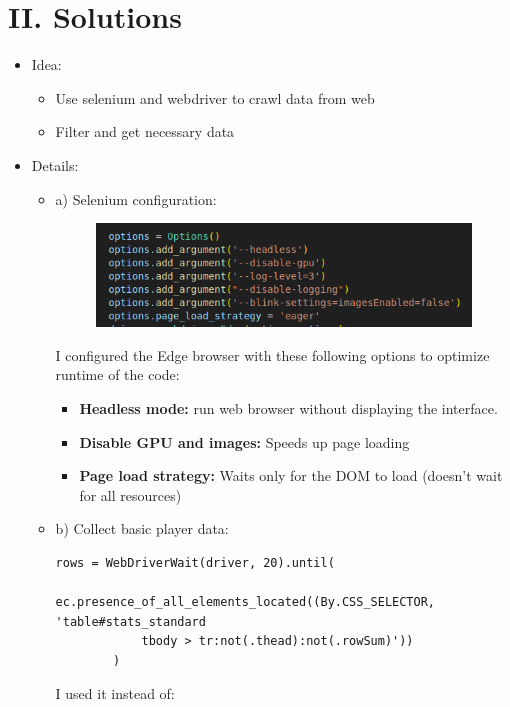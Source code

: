 \documentclass[a4paper,12pt]{article}
\begin{document}
\section*{II. Solutions}
\begin{itemize}[label= {*}, leftmargin= 1cm]
    \subsection*{1) Problem 1}
    \item {\Large Idea:}
    \begin{itemize}[label= {-}, leftmargin= 1cm]
        \item Use selenium and webdriver to crawl data from web
        \item Filter and get necessary data
    \end{itemize}
    \item {\Large Details:}
    \begin{itemize}[label= {}, leftmargin= 1cm]
        \item a) Selenium configuration:

        \begin{figure}[h]
            \centering
            \includegraphics[width=0.7\linewidth]{options.png}
        \end{figure}
        I configured the Edge browser with these following options to optimize runtime of the code:
        \begin{itemize}[label= {-}]
            \item \textbf{Headless mode:} run web browser without displaying the interface.
            \item \textbf{Disable GPU and images:} Speeds up page loading
            \item \textbf{Page load strategy:} Waits only for the DOM to load (doesn't wait for all resources)
        \end{itemize}
        
        \item b) Collect basic player data:

        \begin{Verbatim}[fontsize=\footnotesize, xleftmargin=-1cm]
        rows = WebDriverWait(driver, 20).until(
            ec.presence_of_all_elements_located((By.CSS_SELECTOR, 'table#stats_standard 
            tbody > tr:not(.thead):not(.rowSum)'))
        )   
        \end{Verbatim}
        I used it instead of:
        

\end{itemize}
\end{itemize}
\end{document}
